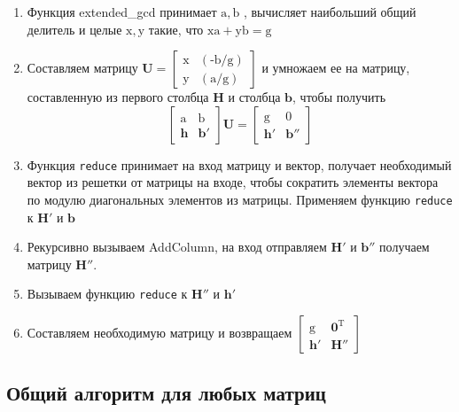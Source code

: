 \begin{enumerate}
\item Функция extended\_gcd принимает $ \mathrm{a, b} $ , вычисляет наибольший общий делитель и целые $ \mathrm{x, y} $ такие, что $ \mathrm{xa + yb = g} $
\item Составляем матрицу $ \mathbf{U}= \left[\begin{array}{cccc}
\mathrm{x} & \mathrm{(\text{-}b/g)} \\
\mathrm{y} & \mathrm{(a/g)} \end{array}\right] $ и умножаем ее на матрицу, составленную из первого столбца $ \mathbf{H} $ и столбца $ \mathbf{b} $, чтобы получить
$$ \left[\begin{array}{cccc}
\mathrm{a} & \mathrm{b} \\
\mathbf{h} & \mathbf{b}' \end{array}\right] \mathbf{U}=
\left[\begin{array}{cccc}
\mathrm{g} & \mathrm{0} \\
\mathbf{h}' & \mathbf{b}'' \end{array}\right] $$
\item Функция \verb!reduce! принимает на вход матрицу и вектор, получает необходимый вектор из решетки от матрицы на входе, чтобы сократить элементы вектора по модулю диагональных элементов из матрицы. Применяем функцию \verb!reduce! к $ \mathbf{H}' $ и $ \mathbf{b} $
\item Рекурсивно вызываем AddColumn, на вход отправляем $ \mathbf{H}' $ и $ \mathbf{b}'' $  получаем матрицу $ \mathbf{H}'' $.
\item Вызываем функцию \verb!reduce! к $ \mathbf{H}'' $ и $ \mathbf{h}' $
\item Составляем необходимую матрицу и возвращаем $ \left[\begin{array}{cccc}
\mathrm{g} & \mathbf{0}^\mathrm{T} \\
\mathbf{h}' & \mathbf{H}'' \end{array}\right] $
\end{enumerate}

\subsection{Общий алгоритм для любых матриц}

